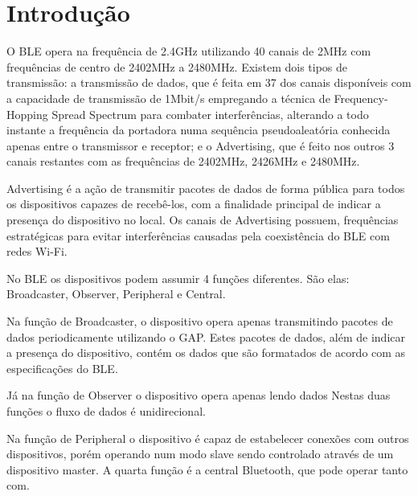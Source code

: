\section{Introdução}



O BLE opera na frequência de 2.4GHz utilizando 40 canais de 2MHz com frequências de centro de 2402MHz a 2480MHz. 
Existem dois tipos de transmissão: a transmissão de dados, que é feita em 37 dos canais disponíveis com a capacidade 
de transmissão de 1Mbit/s empregando a técnica de Frequency-Hopping Spread Spectrum para combater interferências, 
alterando a todo instante a frequência da portadora numa sequência pseudoaleatória conhecida apenas entre o transmissor
e receptor; e o Advertising, que é feito nos outros 3 canais restantes com as frequências de 2402MHz, 2426MHz e 2480MHz.

Advertising é a ação de transmitir pacotes de dados de forma pública para todos os dispositivos capazes de recebê-los, com a finalidade
principal de indicar a presença do dispositivo no local.
Os canais de Advertising possuem, frequências estratégicas para evitar interferências causadas pela coexistência do BLE com redes Wi-Fi.



No BLE os dispositivos podem assumir 4 funções diferentes. São elas: Broadcaster, Observer, Peripheral e Central.

Na função de Broadcaster, o dispositivo opera apenas transmitindo pacotes de dados periodicamente utilizando o GAP. Estes pacotes
de dados, além de indicar a presença do dispositivo, contém os dados que são formatados de acordo com as especificações do BLE.

Já na função de Observer o dispositivo opera apenas lendo dados Nestas duas funções o fluxo de dados é unidirecional.

Na função de Peripheral o dispositivo é capaz de estabelecer conexões com outros dispositivos, porém operando num modo slave sendo controlado através de um dispositivo master. A quarta função é a central Bluetooth, que pode operar tanto com.




